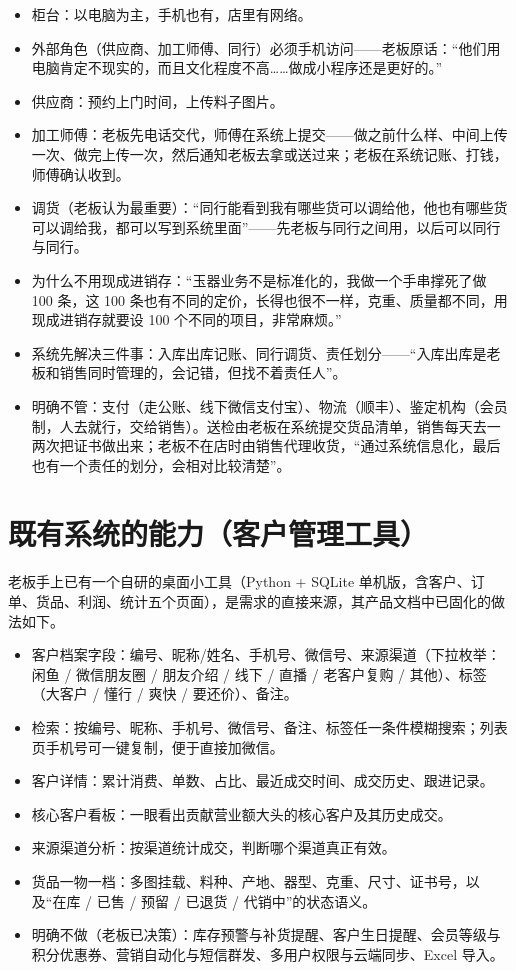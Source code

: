 \documentclass[12pt, a4paper]{ctexart}
\begin{document}
\begin{itemize}[leftmargin=1.6em, itemsep=2pt]
  \item 柜台：以电脑为主，手机也有，店里有网络。
  \item 外部角色（供应商、加工师傅、同行）必须手机访问——老板原话：“他们用电脑肯定不现实的，而且文化程度不高……做成小程序还是更好的。”
  \item 供应商：预约上门时间，上传料子图片。
  \item 加工师傅：老板先电话交代，师傅在系统上提交——做之前什么样、中间上传一次、做完上传一次，然后通知老板去拿或送过来；老板在系统记账、打钱，师傅确认收到。
  \item 调货（老板认为最重要）：“同行能看到我有哪些货可以调给他，他也有哪些货可以调给我，都可以写到系统里面”——先老板与同行之间用，以后可以同行与同行。
  \item 为什么不用现成进销存：“玉器业务不是标准化的，我做一个手串撑死了做 100 条，这 100 条也有不同的定价，长得也很不一样，克重、质量都不同，用现成进销存就要设 100 个不同的项目，非常麻烦。”
  \item 系统先解决三件事：入库出库记账、同行调货、责任划分——“入库出库是老板和销售同时管理的，会记错，但找不着责任人”。
  \item 明确不管：支付（走公账、线下微信支付宝）、物流（顺丰）、鉴定机构（会员制，人去就行，交给销售）。送检由老板在系统提交货品清单，销售每天去一两次把证书做出来；老板不在店时由销售代理收货，“通过系统信息化，最后也有一个责任的划分，会相对比较清楚”。
\end{itemize}

\section{既有系统的能力（客户管理工具）}

老板手上已有一个自研的桌面小工具（Python + SQLite 单机版，含客户、订单、货品、利润、统计五个页面），是需求的直接来源，其产品文档中已固化的做法如下。

\begin{itemize}[leftmargin=1.6em, itemsep=2pt]
  \item 客户档案字段：编号、昵称/姓名、手机号、微信号、来源渠道（下拉枚举：闲鱼 / 微信朋友圈 / 朋友介绍 / 线下 / 直播 / 老客户复购 / 其他）、标签（大客户 / 懂行 / 爽快 / 要还价）、备注。
  \item 检索：按编号、昵称、手机号、微信号、备注、标签任一条件模糊搜索；列表页手机号可一键复制，便于直接加微信。
  \item 客户详情：累计消费、单数、占比、最近成交时间、成交历史、跟进记录。
  \item 核心客户看板：一眼看出贡献营业额大头的核心客户及其历史成交。
  \item 来源渠道分析：按渠道统计成交，判断哪个渠道真正有效。
  \item 货品一物一档：多图挂载、料种、产地、器型、克重、尺寸、证书号，以及“在库 / 已售 / 预留 / 已退货 / 代销中”的状态语义。
  \item 明确不做（老板已决策）：库存预警与补货提醒、客户生日提醒、会员等级与积分优惠券、营销自动化与短信群发、多用户权限与云端同步、Excel 导入。
\end{itemize}
\end{document}
